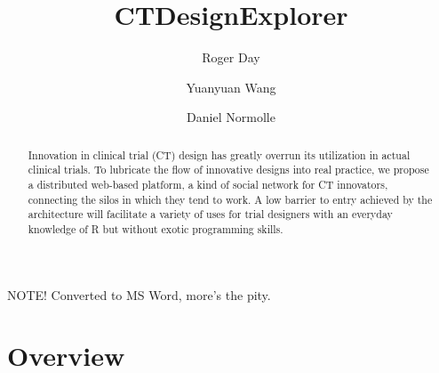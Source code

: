 \documentclass[12pt]{amsart}
\let\origmaketitle\maketitle
\def\maketitle{
  \begingroup
  \def\uppercasenonmath##1{} %
  \let\MakeUppercase\relax %
  \origmaketitle
  \endgroup
}
\begin{document}
\title{CTDesignExplorer}
\author{Roger Day}
\author{Yuanyuan Wang}
\author{Daniel Normolle}



\date{} 
NOTE!   Converted to MS Word, more's the pity.

\begin{abstract}
Innovation in clinical trial (CT) design has greatly overrun its utilization in actual clinical trials. 
To lubricate the flow of innovative designs into real practice, 
we propose a distributed web-based platform, 
a kind of social network for CT innovators, 
connecting the silos in which they tend to work.
A low barrier to entry achieved by the architecture will facilitate
a variety of uses for trial designers with an everyday knowledge of R
but without exotic programming skills.  
\end{abstract}


\maketitle



\section{Overview}
\end{document}

